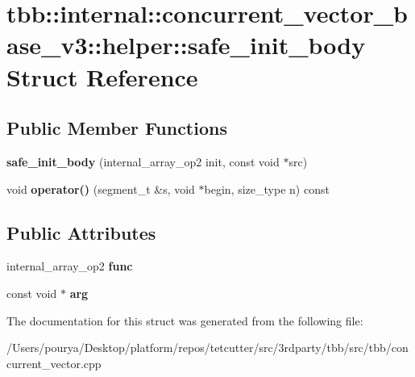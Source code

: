 \hypertarget{structtbb_1_1internal_1_1concurrent__vector__base__v3_1_1helper_1_1safe__init__body}{}\section{tbb\+:\+:internal\+:\+:concurrent\+\_\+vector\+\_\+base\+\_\+v3\+:\+:helper\+:\+:safe\+\_\+init\+\_\+body Struct Reference}
\label{structtbb_1_1internal_1_1concurrent__vector__base__v3_1_1helper_1_1safe__init__body}
\subsection*{Public Member Functions}
\begin{DoxyCompactItemize}
\item 
\hypertarget{structtbb_1_1internal_1_1concurrent__vector__base__v3_1_1helper_1_1safe__init__body_aab1c3ec9c1b2840e3419170c66edc258}{}{\bfseries safe\+\_\+init\+\_\+body} (internal\+\_\+array\+\_\+op2 init, const void $\ast$src)\label{structtbb_1_1internal_1_1concurrent__vector__base__v3_1_1helper_1_1safe__init__body_aab1c3ec9c1b2840e3419170c66edc258}

\item 
\hypertarget{structtbb_1_1internal_1_1concurrent__vector__base__v3_1_1helper_1_1safe__init__body_aa0ad45ee7533a1ddfc4f4f35e5801da4}{}void {\bfseries operator()} (segment\+\_\+t \&s, void $\ast$begin, size\+\_\+type n) const \label{structtbb_1_1internal_1_1concurrent__vector__base__v3_1_1helper_1_1safe__init__body_aa0ad45ee7533a1ddfc4f4f35e5801da4}

\end{DoxyCompactItemize}
\subsection*{Public Attributes}
\begin{DoxyCompactItemize}
\item 
\hypertarget{structtbb_1_1internal_1_1concurrent__vector__base__v3_1_1helper_1_1safe__init__body_a0c9a91b10021038d6bd05949cd86192b}{}internal\+\_\+array\+\_\+op2 {\bfseries func}\label{structtbb_1_1internal_1_1concurrent__vector__base__v3_1_1helper_1_1safe__init__body_a0c9a91b10021038d6bd05949cd86192b}

\item 
\hypertarget{structtbb_1_1internal_1_1concurrent__vector__base__v3_1_1helper_1_1safe__init__body_a759a71d5051a172483cbbbe99583ef6c}{}const void $\ast$ {\bfseries arg}\label{structtbb_1_1internal_1_1concurrent__vector__base__v3_1_1helper_1_1safe__init__body_a759a71d5051a172483cbbbe99583ef6c}

\end{DoxyCompactItemize}


The documentation for this struct was generated from the following file\+:\begin{DoxyCompactItemize}
\item 
/\+Users/pourya/\+Desktop/platform/repos/tetcutter/src/3rdparty/tbb/src/tbb/concurrent\+\_\+vector.\+cpp\end{DoxyCompactItemize}
